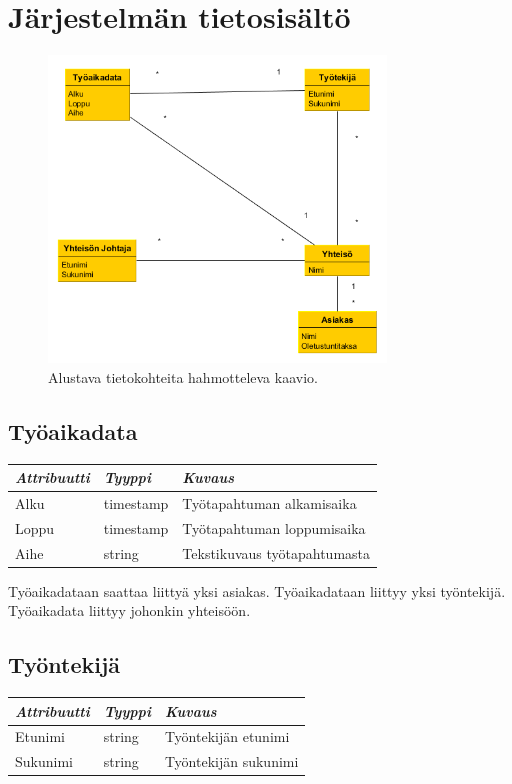 \documentclass[a4paper, 12pt finnish]{article}
\begin{document}
\section{Järjestelmän tietosisältö}
\begin{figure}[h]
    \centering
    \includegraphics[width=0.8\textwidth]{maarittelykaavio.png}
    \caption{\small Alustava tietokohteita hahmotteleva kaavio.}
\end{figure} 

\subsection{Työaikadata}

\begin{center}
\begin{tabular}{| l | l | l |}
    \hline
    \emph{Attribuutti} & \emph{Tyyppi} & \emph{Kuvaus} \\ \hline
    Alku & timestamp & Työtapahtuman alkamisaika \\ \hline
    Loppu & timestamp & Työtapahtuman loppumisaika \\ \hline
    Aihe & string & Tekstikuvaus työtapahtumasta \\ \hline
\end{tabular}
\end{center}

Työaikadataan saattaa liittyä yksi asiakas. Työaikadataan liittyy yksi
työntekijä. Työaikadata liittyy johonkin yhteisöön.

\subsection{Työntekijä}
\begin{center}
\begin{tabular}{| l | l | l |}
    \hline
    \emph{Attribuutti} & \emph{Tyyppi} & \emph{Kuvaus} \\ \hline
    Etunimi & string & Työntekijän etunimi \\ \hline
    Sukunimi & string & Työntekijän sukunimi \\ \hline
\end{tabular}
\end{center}
\end{document}
